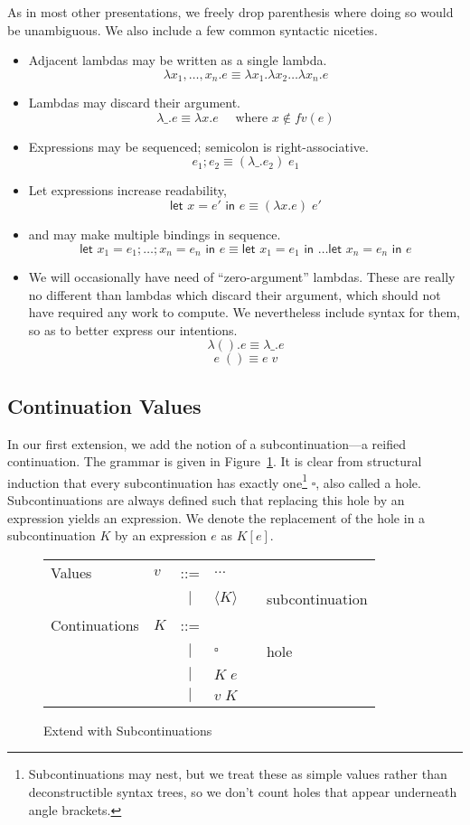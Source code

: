 \documentclass[11pt]{article}
\newcommand{\maybePage}{\newpage}
\newcommand\x{\lambda x}
\newcommand{\letin}[2]{\textsf{let }#1\textsf{ in }#2}
\newcommand{\angles}[1]{\langle#1\rangle}
\begin{document}
As in most other presentations, we freely drop parenthesis where doing so would be unambiguous.
We also include a few common syntactic niceties.
\begin{itemize}
\item Adjacent lambdas may be written as a single lambda.
	$$\x_1,\ldots,x_n.e \equiv \x_1.\x_2\ldots\x_n.e$$
\item Lambdas may discard their argument.
	$$\lambda\_.e \equiv \x.e \quad\textrm{ where }x \notin fv(e)$$
\item Expressions may be sequenced; semicolon is right-associative.
	$$e_1; e_2 \equiv (\lambda\_.e_2)\;e_1$$
\item Let expressions increase readability,
	$$\letin{x = e'}{e} \equiv (\x.e)\;e'$$
\item and may make multiple bindings in sequence.
	$$\letin{x_1 = e_1; \ldots; x_n = e_n}{e} \equiv \letin{x_1 = e_1}{\ldots\letin{x_n = e_n}{e}}$$
\item We will occasionally have need of ``zero-argument'' lambdas.
These are really no different than lambdas which discard their argument, which should not have required any work to compute.
We nevertheless include syntax for them, so as to better express our intentions.
	$$\lambda().e \equiv \lambda\_.e$$
	$$e\;() \equiv e\;v$$
\end{itemize}


\maybePage
\subsection{Continuation Values}

In our first extension, we add the notion of a subcontinuation---a reified continuation.
The grammar is given in Figure~\ref{fig:addSubconts}.
It is clear from structural induction that every subcontinuation has exactly one\footnote{Subcontinuations may nest, but we treat these as simple values rather than deconstructible syntax trees, so we don't count holes that appear underneath angle brackets.} $\square$, also called a hole.
Subcontinuations are always defined such that replacing this hole by an expression yields an expression.
We denote the replacement of the hole in a subcontinuation $K$ by an expression $e$ as $K[e]$.

\begin{figure}[H]
\caption{Extend with Subcontinuations}
\label{fig:addSubconts}

\begin{tabular}{llclll}
Values & $v$ & ::= & $\ldots$ \\
& & $|$ & $\angles{K}$ && subcontinuation \\
Continuations & $K$ & ::= & \\
& & $|$ & $\square$ && hole \\
& & $|$ & $K\;e$ &&  \\
& & $|$ & $v\;K$ &&  \\

\end{tabular}
\end{figure}
\end{document}
